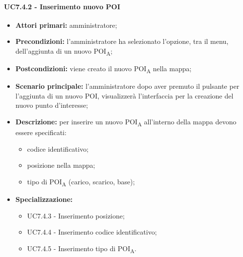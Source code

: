 \paragraph{UC7.4.2 - Inserimento nuovo POI}

\begin{itemize}
	\item 	\textbf{Attori primari:} amministratore;
	\item 	\textbf{Precondizioni:} l'amministratore ha selezionato l'opzione, tra il menu, dell'aggiunta di un nuovo POI\textsubscript{A};
	\item 	\textbf{Postcondizioni:} viene creato il nuovo POI\textsubscript{A} nella mappa;
	\item 	\textbf{Scenario principale:} l'amministratore dopo aver premuto il pulsante per l'aggiunta di un nuovo POI, visualizzerà l'interfaccia per la creazione del nuovo punto d'interesse;
	\item 	\textbf{Descrizione:} per inserire un nuovo POI\textsubscript{A} all'interno della mappa devono essere specificati:
	\begin{itemize}
		\item codice identificativo;
		\item posizione nella mappa;
		\item tipo di POI\textsubscript{A} (carico, scarico, base);
	\end{itemize}
	\item 	\textbf{Specializzazione:}
	\begin{itemize}
		\item UC7.4.3 - Inserimento posizione;
		\item UC7.4.4 - Inserimento codice identificativo;
		\item UC7.4.5 - Inserimento tipo di POI\textsubscript{A}.
	\end{itemize}
\end{itemize}

